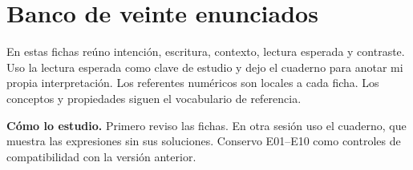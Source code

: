 \section{Banco de veinte enunciados}\label{sec:corpus}
En estas fichas reúno intención, escritura, contexto, lectura esperada y contraste.
Uso la lectura esperada como clave de estudio y dejo el cuaderno para anotar
mi propia interpretación. Los referentes numéricos son
locales a cada ficha. Los conceptos y propiedades siguen el vocabulario de referencia.
\par\textbf{Cómo lo estudio.} Primero reviso las fichas. En otra sesión uso el
cuaderno, que muestra las expresiones sin sus soluciones. Conservo E01--E10
como controles de compatibilidad con la versión anterior.
\clearpage
{}\vspace{5mm}\clearpage
{}\vspace{5mm}\clearpage
{}\vspace{5mm}\clearpage
{}\vspace{5mm}\clearpage
{}\vspace{5mm}\clearpage
{}\vspace{5mm}\clearpage
{}\vspace{5mm}\clearpage
{}\vspace{5mm}\clearpage
{}\vspace{5mm}\clearpage
{}\vspace{5mm}
